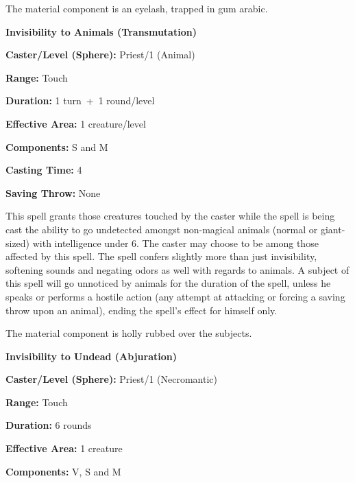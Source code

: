 \begin{multicols}{2}
The material component is an eyelash, trapped in gum arabic.

\vspace{1em}

\noindent
\begin{minipage}{\columnwidth}

\noindent \textbf{Invisibility to Animals (Transmutation)}

\noindent \textbf{Caster/Level (Sphere):} Priest/1 (Animal)

\noindent \textbf{Range:} Touch

\noindent \textbf{Duration:} 1 turn~+~1 round/level

\noindent \textbf{Effective Area:} 1 creature/level

\noindent \textbf{Components:} S and M

\noindent \textbf{Casting Time:} 4

\noindent \textbf{Saving Throw:} None

\end{minipage}

This spell grants those creatures touched by the caster while the spell is being cast the ability to go undetected amongst non-magical animals (normal or giant-sized) with intelligence under 6.  The caster may choose to be among those affected by this spell.  The spell confers slightly more than just invisibility, softening sounds and negating odors as well with regards to animals.  A subject of this spell will go unnoticed by animals for the duration of the spell, unless he speaks or performs a hostile action (any attempt at attacking or forcing a saving throw upon an animal), ending the spell's effect for himself only.

The material component is holly rubbed over the subjects.

\vspace{1em}

\noindent
\begin{minipage}{\columnwidth}

\noindent \textbf{Invisibility to Undead (Abjuration)}

\noindent \textbf{Caster/Level (Sphere):} Priest/1 (Necromantic)

\noindent \textbf{Range:} Touch

\noindent \textbf{Duration:} 6 rounds

\noindent \textbf{Effective Area:} 1 creature

\noindent \textbf{Components:} V, S and M


\end{minipage}
\end{multicols}
